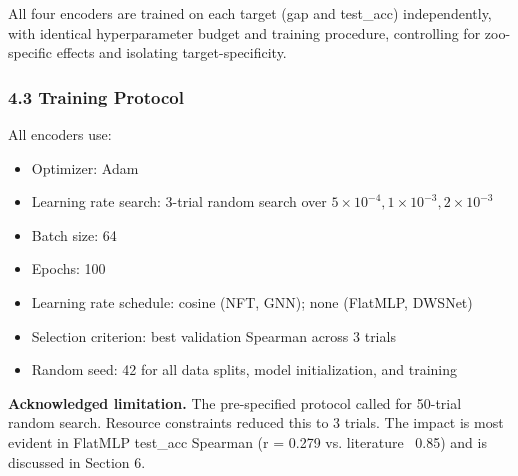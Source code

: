 \begin{table}[htbp]
\centering
{}
\end{table}

All four encoders are trained on each target (gap and test\_acc) independently, with identical
hyperparameter budget and training procedure, controlling for zoo-specific effects and isolating
target-specificity.

\subsubsection{4.3 Training Protocol}

All encoders use:
\begin{itemize}
\item Optimizer: Adam
\item Learning rate search: 3-trial random search over ${5\times 10^{-4}, 1\times 10^{-3}, 2\times 10^{-3}}$
\item Batch size: 64
\item Epochs: 100
\item Learning rate schedule: cosine (NFT, GNN); none (FlatMLP, DWSNet)
\item Selection criterion: best validation Spearman across 3 trials
\item Random seed: 42 for all data splits, model initialization, and training
\end{itemize}

\textbf{Acknowledged limitation.} The pre-specified protocol called for 50-trial random search. Resource
constraints reduced this to 3 trials. The impact is most evident in FlatMLP test\_acc Spearman
(r = 0.279 vs. literature ~0.85) and is discussed in Section 6.


